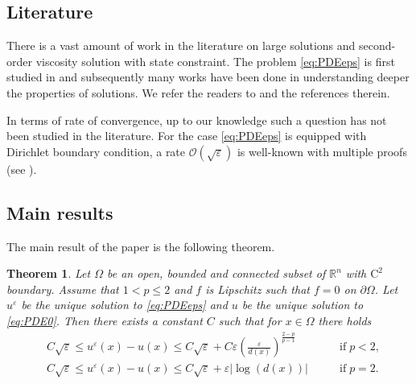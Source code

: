 \documentclass[11pt,reqno]{amsart}
\numberwithin{figure}{section}
\theoremstyle{plain}
\newtheorem{thm}{Theorem}[section]
\theoremstyle{remark}
\numberwithin{equation}{section}
\newcommand{\R}{\mathbb{R}}
\begin{document}

\subsection{Literature} There is a
vast amount of work in the literature on large solutions and second-order viscosity solution with state constraint. The problem \eqref{eq:PDEeps} is first studied in \cite{Lasry1989} and subsequently many works have been done in understanding deeper the properties of solutions. We refer the readers to \cite{alessio_asymptotic_2006} and the references therein. 

In terms of rate of convergence, up to our knowledge such a question has not been studied in the literature. For the case \eqref{eq:PDEeps} is equipped with Dirichlet boundary condition, a rate $\mathcal{O}(\sqrt{\varepsilon})$ is well-known with multiple proofs (see \cite{Hung2019}). 

\subsection{Main results} The main result of the paper is the following theorem.


\begin{thm} Let $\Omega$ be an open, bounded and connected subset of $\R^n$ with $\mathrm{C}^2$ boundary. Assume that $1 < p\leq 2$ and $f$ is Lipschitz such that $f = 0$ on $\partial\Omega$. Let $u^\varepsilon$ be the unique solution to \eqref{eq:PDEeps} and $u$ be the unique solution to \eqref{eq:PDE0}. Then there exists a constant $C$ such that for $x\in \Omega$ there holds
\begin{align*}
    &C\sqrt{\varepsilon}\leq  u^\varepsilon(x) - u(x)\leq C\sqrt{\varepsilon} + C\varepsilon \left(\frac{\varepsilon}{d(x)}\right)^{\frac{2-p}{p-1}} &\qquad\text{if}\; p < 2,\\
    &C\sqrt{\varepsilon}\leq  u^\varepsilon(x) - u(x)\leq C\sqrt{\varepsilon} + \varepsilon|\log(d(x))| &\qquad\text{if}\; p = 2.
\end{align*}
\end{thm}
\end{document}
